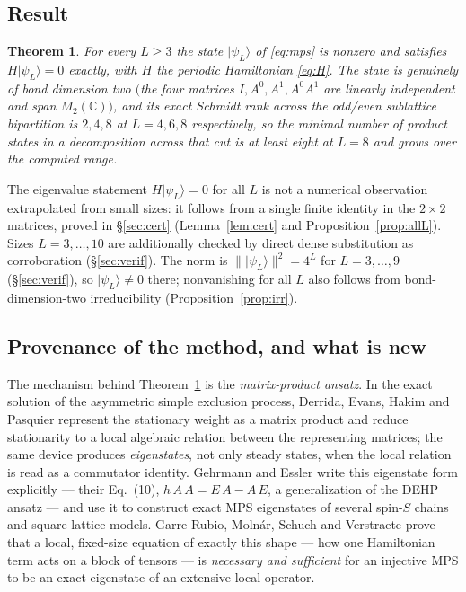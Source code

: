\documentclass[11pt]{amsart}
\newcommand{\ket}[1]{\lvert #1 \rangle}
\newcommand{\Mtwo}{M_2(\mathbb{C})}
\newcommand{\psiL}{\ket{\psi_L}}
\theoremstyle{plain}
\newtheorem{theorem}{Theorem}[section]
\theoremstyle{definition}
\theoremstyle{remark}
\begin{document}
\subsection{Result}\label{ssec:result}

\begin{theorem}\label{thm:main}
For every $L\ge 3$ the state $\psiL$ of \eqref{eq:mps} is nonzero and
satisfies $H\psiL=0$ exactly, with $H$ the periodic Hamiltonian
\eqref{eq:H}. The state is genuinely of bond dimension two
$\bigl($the four matrices $I,A^0,A^1,A^0A^1$ are linearly independent and
span $\Mtwo\bigr)$, and its exact Schmidt rank across the odd/even
sublattice bipartition is $2,4,8$ at $L=4,6,8$ respectively, so the minimal
number of product states in a decomposition across that cut is at least eight
at $L=8$ and grows over the computed range.
\end{theorem}

The eigenvalue statement $H\psiL=0$ for all $L$ is not a numerical
observation extrapolated from small sizes: it follows from a single finite
identity in the $2\times2$ matrices, proved in \S\ref{sec:cert}
(Lemma~\ref{lem:cert} and Proposition~\ref{prop:allL}). Sizes
$L=3,\dots,10$ are additionally checked by direct dense substitution as
corroboration (\S\ref{sec:verif}). The norm is
$\lVert\psiL\rVert^2=4^{L}$ for $L=3,\dots,9$
(\S\ref{sec:verif}), so $\psiL\neq0$ there; nonvanishing for all $L$ also
follows from bond-dimension-two irreducibility (Proposition~\ref{prop:irr}).

\subsection{Provenance of the method, and what is new}\label{ssec:credit}
The mechanism behind Theorem~\ref{thm:main} is the \emph{matrix-product
ansatz}. In the exact solution of the asymmetric simple exclusion process,
Derrida, Evans, Hakim and Pasquier \cite{DEHP93} represent the stationary
weight as a matrix product and reduce stationarity to a local algebraic
relation between the representing matrices; the same device produces
\emph{eigenstates}, not only steady states, when the local relation is read
as a commutator identity. Gehrmann and Essler \cite{GE26} write this
eigenstate form explicitly --- their Eq.~(10), $h\,A\,A=E\,A-A\,E$, a
generalization of the DEHP ansatz --- and use it to construct exact MPS
eigenstates of several spin-$S$ chains and square-lattice models. Garre
Rubio, Moln\'ar, Schuch and Verstraete \cite{GRMSV26} prove that a local,
fixed-size equation of exactly this shape --- how one Hamiltonian term acts
on a block of tensors --- is \emph{necessary and sufficient} for an
injective MPS to be an exact eigenstate of an extensive local operator.
\end{document}
